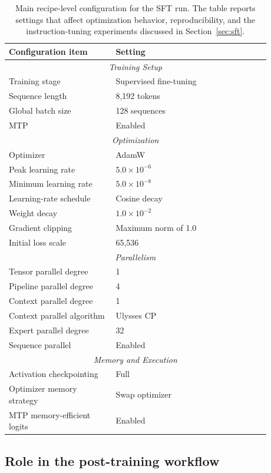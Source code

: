 \begin{table}[t]
\centering
\small
\caption{Main recipe-level configuration for the SFT run. The table reports settings that affect optimization behavior, reproducibility, and the instruction-tuning experiments discussed in Section~\ref{sec:sft}.}
\begin{tabular}{p{0.36\linewidth}p{0.52\linewidth}}
\toprule
Configuration item & Setting \\
\midrule
\multicolumn{2}{c}{\textit{Training Setup}} \\
\midrule
Training stage & Supervised fine-tuning\\
Sequence length & 8,192 tokens \\
Global batch size & 128 sequences \\
MTP & Enabled \\
\midrule
\multicolumn{2}{c}{\textit{Optimization}} \\
\midrule
Optimizer & AdamW \\
Peak learning rate & $5.0\times10^{-6}$ \\
Minimum learning rate & $5.0\times10^{-8}$ \\
Learning-rate schedule & Cosine decay \\
Weight decay & $1.0\times10^{-2}$ \\
Gradient clipping & Maximum norm of 1.0 \\
Initial loss scale & 65,536 \\
\midrule
\multicolumn{2}{c}{\textit{Parallelism}} \\
\midrule
Tensor parallel degree & 1 \\
Pipeline parallel degree & 4 \\
Context parallel degree & 1 \\
Context parallel algorithm & Ulysses CP \\
Expert parallel degree & 32 \\
Sequence parallel & Enabled \\
\midrule
\multicolumn{2}{c}{\textit{Memory and Execution}} \\
\midrule
Activation checkpointing & Full \\
Optimizer memory strategy & Swap optimizer \\
MTP memory-efficient logits & Enabled \\

\bottomrule
\end{tabular}
\label{tab:sft_training_recipe}
\end{table}
\subsection{Role in the post-training workflow}
\label{app:orcpt-role}

